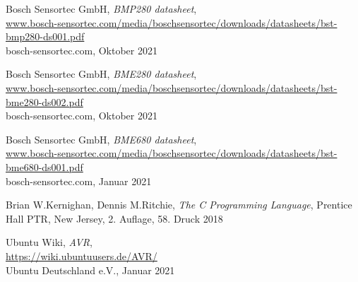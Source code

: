 \documentclass[12pt, a4paper, oneside]{report}
\begin{document}
\begin{thebibliography}{9}
  Bosch Sensortec GmbH,
  \textit{BMP280 datasheet},\\
  \url{www.bosch-sensortec.com/media/boschsensortec/downloads/datasheets/bst-bmp280-ds001.pdf}\\
  bosch-sensortec.com,
  Oktober 2021
  
  Bosch Sensortec GmbH,
  \textit{BME280 datasheet},\\
  \url{www.bosch-sensortec.com/media/boschsensortec/downloads/datasheets/bst-bme280-ds002.pdf}\\
  bosch-sensortec.com,
  Oktober 2021
  
  Bosch Sensortec GmbH,
  \textit{BME680 datasheet},\\
  \url{www.bosch-sensortec.com/media/boschsensortec/downloads/datasheets/bst-bme680-ds001.pdf}\\
  bosch-sensortec.com,
  Januar 2021

  Brian W.Kernighan, Dennis M.Ritchie,
  \textit{The C Programming Language},
  Prentice Hall PTR, New Jersey,
  2. Auflage, 58. Druck 2018
  
  Ubuntu Wiki,
  \textit{AVR},\\
  \url{https://wiki.ubuntuusers.de/AVR/}\\
  Ubuntu Deutschland e.V.,
  Januar 2021

\end{thebibliography}
\end{document}
